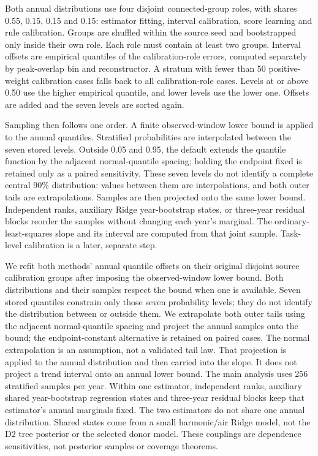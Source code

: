 Both annual distributions use four disjoint connected-group roles, with shares 0.55, 0.15, 0.15 and 0.15: estimator fitting, interval calibration, score learning and rule calibration. Groups are shuffled within the source seed and bootstrapped only inside their own role. Each role must contain at least two groups. Interval offsets are empirical quantiles of the calibration-role errors, computed separately by peak-overlap bin and reconstructor. A stratum with fewer than 50 positive-weight calibration cases falls back to all calibration-role cases. Levels at or above 0.50 use the higher empirical quantile, and lower levels use the lower one. Offsets are added and the seven levels are sorted again.

Sampling then follows one order. A finite observed-window lower bound is applied to the annual quantiles. Stratified probabilities are interpolated between the seven stored levels. Outside 0.05 and 0.95, the default extends the quantile function by the adjacent normal-quantile spacing; holding the endpoint fixed is retained only as a paired sensitivity. These seven levels do not identify a complete central 90\% distribution: values between them are interpolations, and both outer tails are extrapolations. Samples are then projected onto the same lower bound. Independent ranks, auxiliary Ridge year-bootstrap states, or three-year residual blocks reorder the samples without changing each year's marginal. The ordinary-least-squares slope and its interval are computed from that joint sample. Task-level calibration is a later, separate step.

We refit both methods' annual quantile offsets on their original disjoint source calibration groups after imposing the observed-window lower bound. Both distributions and their samples respect the bound when one is available. Seven stored quantiles constrain only those seven probability levels; they do not identify the distribution between or outside them. We extrapolate both outer tails using the adjacent normal-quantile spacing and project the annual samples onto the bound; the endpoint-constant alternative is retained on paired cases. The normal extrapolation is an assumption, not a validated tail law. That projection is applied to the annual distribution and then carried into the slope. It does not project a trend interval onto an annual lower bound. The main analysis uses 256 stratified samples per year. Within one estimator, independent ranks, auxiliary shared year-bootstrap regression states and three-year residual blocks keep that estimator's annual marginals fixed. The two estimators do not share one annual distribution. Shared states come from a small harmonic/air Ridge model, not the D2 tree posterior or the selected donor model. These couplings are dependence sensitivities, not posterior samples or coverage theorems.

